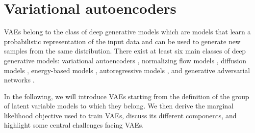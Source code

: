 \section{Variational autoencoders}

VAEs belong to the class of deep generative models which are models that learn a probabilistic representation of the input data and can be used to generate new samples from the same distribution. 
There exist at least six main classes of deep generative models: variational autoencoders \cite{kingma_autoencoding_2014,rezende_stochastic_2014,ranganath_hierarchical_2016,vahdat_nvae_2020,child_very_2021}, normalizing flow models \cite{dinh_nice_2015,rezende_variational_2015,dinh_density_2017,kingma_glow_2018,grathwohl_ffjord_2018}, diffusion models \cite{sohl-dickstein_deep_2015,song_generative_2019, ho_denoising_2020, vahdat_scorebased_2021}, energy-based models \cite{lecun_tutorial_2006,hinton_fast_2006,salakhutdinov_efficient_2010,du_implicit_2019}, autoregressive models \cite{oord_conditional_2016,oord_wavenet_2016,radford_improving_2018}, and generative adversarial networks \cite{goodfellow_generative_2014,arjovsky_wasserstein_2017,brock_large_2019,karras_stylebased_2019}. 

In the following, we will introduce VAEs starting from the definition of the group of latent variable models to which they belong. We then derive the marginal likelihood objective used to train VAEs, discuss its different components, and highlight some central challenges facing VAEs.


